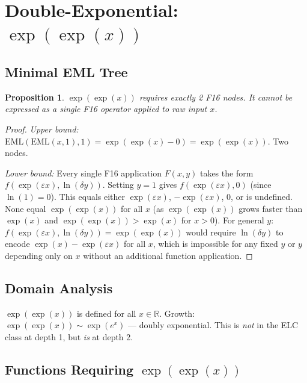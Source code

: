 \documentclass[11pt]{article}
\newtheorem{proposition}[theorem]{Proposition}
\begin{document}
\section{Double-Exponential: $\exp(\exp(x))$}
\label{sec:double-exp}

\subsection{Minimal EML Tree}

\begin{proposition}
$\exp(\exp(x))$ requires exactly 2 F16 nodes. It cannot be expressed as a
single F16 operator applied to raw input $x$.
\end{proposition}

\begin{proof}
\textit{Upper bound:} $\mathrm{EML}(\mathrm{EML}(x,1),1) = \exp(\exp(x) - 0) = \exp(\exp(x))$.
Two nodes.

\textit{Lower bound:} Every single F16 application $F(x,y)$ takes the form
$f(\exp(\varepsilon x), \ln(\delta y))$. Setting $y = 1$ gives
$f(\exp(\varepsilon x), 0)$ (since $\ln(1)=0$). This equals either
$\exp(\varepsilon x)$, $-\exp(\varepsilon x)$, $0$, or is undefined.
None equal $\exp(\exp(x))$ for all $x$ (as $\exp(\exp(x))$ grows faster
than $\exp(x)$ and $\exp(\exp(x)) > \exp(x)$ for $x > 0$).
For general $y$: $f(\exp(\varepsilon x), \ln(\delta y)) = \exp(\exp(x))$
would require $\ln(\delta y)$ to encode $\exp(x) - \exp(\varepsilon x)$ for
all $x$, which is impossible for any fixed $y$ or $y$ depending only on $x$
without an additional function application.
\end{proof}

\subsection{Domain Analysis}

$\exp(\exp(x))$ is defined for all $x \in \mathbb{R}$.
Growth: $\exp(\exp(x)) \sim \exp(e^x)$ --- doubly exponential.
This is \emph{not} in the ELC class at depth 1, but \emph{is} at depth 2.

\subsection{Functions Requiring $\exp(\exp(x))$}
\end{document}
